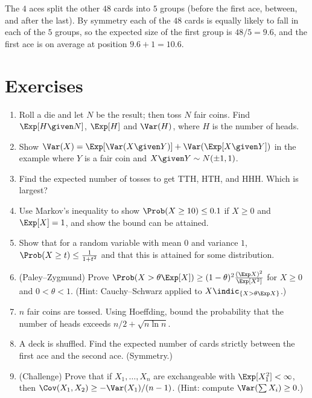 \begin{example}
The $4$ aces split the other $48$ cards into $5$ groups (before the first ace, between,
and after the last). By symmetry each of the $48$ cards is equally likely to fall in
each of the $5$ groups, so the expected size of the first group is $48/5=9.6$, and the
first ace is on average at position $9.6+1=10.6$.
\end{example}

\section*{Exercises}

\begin{enumerate}
\item Roll a die and let $N$ be the result; then toss $N$ fair coins. Find
$\Exp[H\given N]$, $\Exp[H]$ and $\Var(H)$, where $H$ is the number of heads.
\item Show $\Var(X)=\Exp[\Var(X\given Y)]+\Var(\Exp[X\given Y])$ in the example
where $Y$ is a fair coin and $X\given Y\sim N(\pm1,1)$.
\item Find the expected number of tosses to get TTH, HTH, and HHH. Which is
largest?
\item Use Markov's inequality to show $\Prob(X\ge10)\le0.1$ if $X\ge0$ and
$\Exp[X]=1$, and show the bound can be attained.
\item Show that for a random variable with mean $0$ and variance $1$,
$\Prob(X\ge t)\le\frac1{1+t^2}$ and that this is attained for some distribution.
\item (Paley--Zygmund) Prove $\Prob(X>\theta\Exp[X])\ge(1-\theta)^2\frac{(\Exp
X)^2}{\Exp[X^2]}$ for $X\ge0$ and $0<\theta<1$. (Hint: Cauchy--Schwarz applied to
$X\indic_{\{X>\theta\Exp X\}}$.)
\item $n$ fair coins are tossed. Using Hoeffding, bound the probability that the
number of heads exceeds $n/2+\sqrt{n\ln n}$.
\item A deck is shuffled. Find the expected number of cards strictly between the
first ace and the second ace. (Symmetry.)
\item (Challenge) Prove that if $X_1,\dots,X_n$ are exchangeable with
$\Exp[X_1^2]<\infty$, then $\Cov(X_1,X_2)\ge-\Var(X_1)/(n-1)$. (Hint: compute
$\Var(\sum X_i)\ge0$.)
\end{enumerate}
